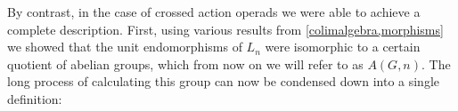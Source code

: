 \documentclass{amsbook} %
\numberwithin{section}{chapter}
\begin{document}
%
%

By contrast, in the case of crossed action operads we were able to achieve a complete description. First, using various results from \cref{colimalgebra,morphisms} we showed that the unit endomorphisms of $L_n$ were isomorphic to a certain quotient of abelian groups, which from now on we will refer to as $A(G,n)$. The long process of calculating this group can now be condensed down into a single definition:
\end{document}
